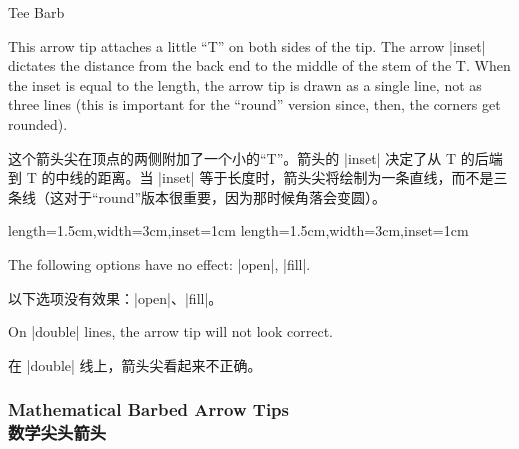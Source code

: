 \begin{arrowtip}{Tee Barb}{
    This arrow tip attaches a little ``T'' on both sides of the tip. The arrow
    |inset| dictates the distance from the back end to the middle of the stem
    of the T. When the inset is equal to the length, the arrow tip is drawn as
    a single line, not as three lines (this is important for the ``round''
    version since, then, the corners get rounded).

    这个箭头尖在顶点的两侧附加了一个小的“T”。箭头的 |inset| 决定了从 T 的后端到 T 的中线的距离。当 |inset| 等于长度时，箭头尖将绘制为一条直线，而不是三条线（这对于“round”版本很重要，因为那时候角落会变圆）。

}%
{length=1.5cm,width=3cm,inset=1cm}%
{length=1.5cm,width=3cm,inset=1cm}

    \begin{arrowexamples}
        \arrowexample[]
        \arrowexampledup[sep]
        \arrowexampledupdot[sep]
        \arrowexample[inset=0pt]
        \arrowexample[inset'=0pt 1]
        \arrowexample[line width=2pt]
        \arrowexample[round]
        \arrowexample[round,inset'=0pt 1]
        \arrowexample[slant=.3]
        \arrowexample[left]
        \arrowexample[right]
        \arrowexample[red]
    \end{arrowexamples}
    The following options have no effect: |open|, |fill|.

    以下选项没有效果：|open|、|fill|。



    On |double| lines, the arrow tip will not look correct.

    在 |double| 线上，箭头尖看起来不正确。


\end{arrowtip}


\subsubsection{Mathematical Barbed Arrow Tips\\数学尖头箭头}

